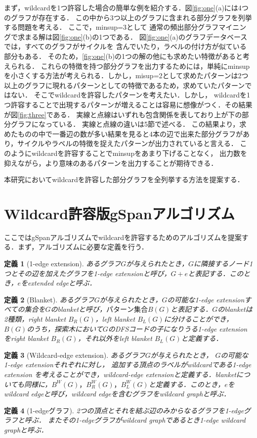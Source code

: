 \documentclass[12pt,fleqn]{jsotsuron}
\newtheorem{Definition}{定義}
\begin{document}
まず，wildcardを1つ許容した場合の簡単な例を紹介する．図\ref{fig:one}(a)には4つのグラフが存在する．
この中から3つ以上のグラフに含まれる部分グラフを列挙する問題を考える．
ここで，minsup=3として
通常の頻出部分グラフマイニングで求まる解は図\ref{fig:one}(b)の1つである．
図\ref{fig:one}(a)のグラフデータベースでは，すべてのグラフがサイクルを
含んでいたり，ラベルの付け方が似ている部分もある．
そのため，\ref{fig:one}(b)の1つの解の他にも求めたい特徴があると考えられる．
これらの特徴を持つ部分グラフを出力するためには，単純にminsupを小さくする方法が考えられる．しかし，misup=2として求めたパターンは2つ以上のグラフに現れるパターンとしての特徴であるため，求めていたパターンではない．
そこでwildcardを許容したパターンを考えたい．しかし，
wildcardを1つ許容することで出現するパターンが増えることは容易に想像がつく．その結果が図\ref{fig:three}である．
実線と点線はいずれも包含関係を表しており上が下の部分グラフになっている．
実線と点線の違いは5節で述べる．
この結果より，求めたものの中で一番辺の数が多い結果を見ると4本の辺で出来た部分グラフがあり，サイクルやラベルの特徴を捉えたパターンが出力されていると言える．
このようにwildcardを許容することでminsupをあまり下げることなく，
出力数を抑えながら，より意味のあるパターンを出力することが期待できる．

本研究においてwildcardを許容した部分グラフを全列挙する方法を提案する．
\section{Wildcard許容版gSpanアルゴリズム}
ここではgSpanアルゴリズムでwildcardを許容するためのアルゴリズムを提案する．まず，アルゴリズムに必要な定義を行う．
\begin{Definition}[1-edge extension]
あるグラフ$G$が与えられたとき，$G$に隣接するノード1つとその辺を加えたグラフを1-edge extensionと呼び，$G+e$と表記する．このとき，$e$をextended edgeと呼ぶ．
\end{Definition}
\begin{Definition}[Blanket]
あるグラフ$G$が与えられたとき，$G$の可能な1-edge extensionすべての集合を$G$のblanketと呼び，$パターン集合B(G)$と表記する．$G$のblanketは2種類，right blanket $B_R(G)$，left blanket $B_L(G)$に分けることができ，$B(G)$のうち，探索木において$G$のDFSコードの子になりうる1-edge extensionをright blanket $B_R(G)$，それ以外をleft blanket $B_L(G)$と定義する．
\end{Definition}
\begin{Definition}[Wildcard-edge extension]
あるグラフ$G$が与えられたとき，
$G$の可能な1-edge extensionそれぞれに対し，
追加する頂点のラベルがwildcardである1-edge extension
を考えることができ，wildcard-edge extensionと定義する．blanketについても同様に，$B^W(G)，B^W_R(G)，B^W_L(G)$と定義する．このとき，$e$をwildcard edgeと呼び，wildcard edgeを含むグラフをwildcard graphと呼ぶ．
\end{Definition}
\begin{Definition}[1-edgeグラフ]
2つの頂点とそれを結ぶ辺のみからなるグラフを1-edgeグラフと呼ぶ．
またその1-edgeグラフがwildcard graphであるとき1-edge wildcard graphと呼ぶ．
\end{Definition}
\end{document}
